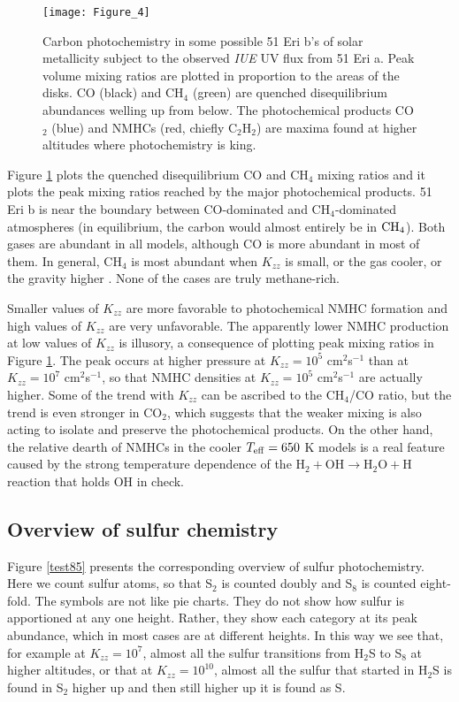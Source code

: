 \documentclass[preprint]{aastex6}
\newcounter{reaction}
\begin{document}
  \begin{figure}[!htb] 
   \centering
   \texttt{[image: Figure\_4]} 
   \caption{\small Carbon photochemistry in some possible 51 Eri b's of solar metallicity 
   subject to the observed {\it IUE} {UV} flux from 51 Eri a.
   Peak volume mixing ratios are plotted in proportion to the areas of the disks.
   CO (black) and CH$_4$ (green) are quenched disequilibrium abundances welling up from below. 
  The photochemical products CO$_2$ (blue) and NMHCs (red, chiefly C$_2$H$_2$) are maxima found at higher altitudes where
   photochemistry is king. 
 }
\label{test95}
\end{figure}

Figure \ref{test95} plots the quenched disequilibrium CO and CH$_4$ mixing ratios
and it plots the peak mixing ratios reached by the major photochemical products. 
 51 Eri b is near the boundary between CO-dominated and CH$_4$-dominated atmospheres (in equilibrium, the carbon
 would almost entirely be in ${\rm CH}_4$).
Both gases are abundant in all models, although CO is more abundant in most of them.
In general, CH$_4$ is most abundant when $K_{zz}$ is small, or the gas cooler, or the gravity higher \citep{Zahnle2014}.
None of the cases are truly methane-rich.

Smaller values of $K_{zz}$ are more favorable to photochemical NMHC formation
and high values of $K_{zz}$ are very unfavorable.
 The apparently lower NMHC production at low values of $K_{zz}$ is illusory,
   a consequence of plotting peak mixing ratios in Figure \ref{test95}.
   The peak occurs at higher pressure at $K_{zz}=10^5$ cm$^2$s$^{-1}$ than
   at $K_{zz}=10^7$ cm$^2$s$^{-1}$, so that NMHC densities at $K_{zz}=10^5$ cm$^2$s$^{-1}$ are actually higher. 
   Some of the trend with $K_{zz}$ can be ascribed to the CH$_4$/CO ratio, but the trend is even stronger in CO$_2$,
   which suggests that the weaker mixing is also acting to isolate and preserve the photochemical products.
   On the other hand, the relative dearth of NMHCs in the cooler $T_{\rm eff}=650$ K models is a real feature
   caused by the strong temperature dependence of the 
   $\mathrm{H}_2 + \mathrm{OH} \rightarrow \mathrm{H}_2\mathrm{O}+\mathrm{H}$ reaction that holds OH in check.


\subsection{Overview of sulfur chemistry}

Figure \ref{test85} presents the corresponding overview of sulfur photochemistry.
Here we count sulfur atoms, so that S$_2$ is counted doubly and
    S$_8$ is counted eight-fold.  The symbols are not like pie charts.
    They do not show how sulfur is apportioned at any one height.
    Rather, they show each category at its peak abundance, which in most cases are at different heights.
    In this way we see that, for example at $K_{zz}=10^7$, almost all the sulfur transitions from H$_2$S to S$_8$ at higher altitudes,
    or that at $K_{zz}=10^{10}$, almost all the sulfur that started in H$_2$S is found in S$_2$ higher up
    and then still higher up it is found as S. 
\end{document}
